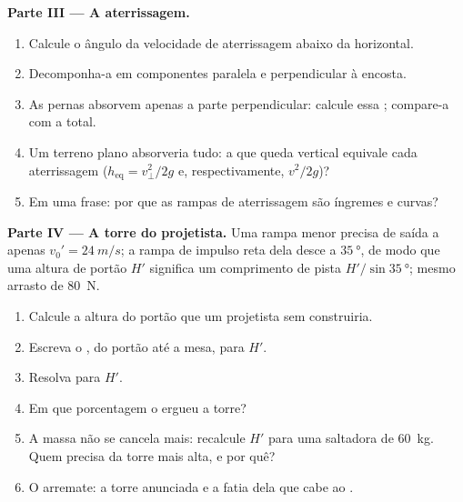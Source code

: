 \begin{problem}
\medskip\noindent\textbf{Parte III --- A aterrissagem.}
\begin{enumerate}[resume]
  \item Calcule o ângulo da velocidade de aterrissagem abaixo da horizontal.
  \item Decomponha-a em componentes paralela e perpendicular à encosta.
  \item As pernas absorvem apenas a parte perpendicular: calcule essa ;
        compare-a com a total.
  \item Um terreno plano absorveria tudo: a que queda vertical equivale cada
        aterrissagem ($h_{\text{eq}} = v_\perp^2/2g$ e, respectivamente, $v^2/2g$)?
  \item Em uma frase: por que as rampas de aterrissagem são íngremes e curvas?
\end{enumerate}

\medskip\noindent\textbf{Parte IV --- A torre do projetista.}
Uma rampa menor precisa de saída a apenas $v_0' = \qty{24}{m/s}$; a rampa de impulso
reta dela desce a $\qty{35}{\degree}$, de modo que uma altura de portão $H'$ significa
um comprimento de pista $H'/\sin\qty{35}{\degree}$; mesmo arrasto de \qty{80}{N}.
\begin{enumerate}[resume]
  \item Calcule a altura do portão que um projetista sem  construiria.
  \item Escreva o , do portão até a mesa, para $H'$.
  \item Resolva para $H'$.
  \item Em que porcentagem o  ergueu a torre?
  \item A massa não se cancela mais: recalcule $H'$ para uma saltadora de \qty{60}{kg}.
        Quem precisa da torre mais alta, e por quê?
  \item O arremate: a torre anunciada e a fatia dela que cabe ao .
\end{enumerate}
\end{problem}
